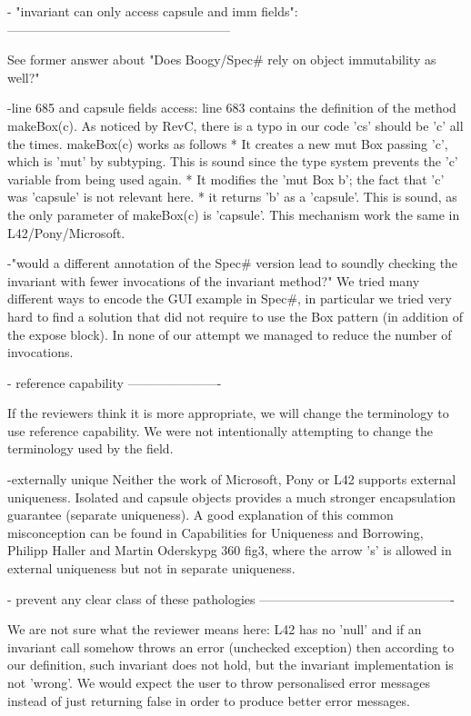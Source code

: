 - "invariant can only access capsule and imm fields":
-----------------------------------------------------

See former answer about "Does Boogy/Spec# rely on object immutability as well?"


-line 685 and capsule fields access:
line 683 contains the definition of the method makeBox(c).
As noticed by RevC, there is a typo in our code 'cs' should be 'c' all the times.
makeBox(c) works as follows
* It creates a new mut Box passing 'c', which is 'mut' by subtyping.
This is sound since the type system prevents the 'c' variable from being used again.
* It modifies the 'mut Box b'; the fact that 'c' was 'capsule' is not relevant here.
* it returns 'b' as a 'capsule'.  This is sound, as the only parameter 
of makeBox(c) is 'capsule'. This mechanism work the same in L42/Pony/Microsoft.

-"would a different annotation of the Spec# version lead to soundly checking the invariant with fewer invocations of the invariant method?"
We tried many different ways to encode the GUI example in Spec#, in particular we tried very hard to find a solution that did not require to use the Box pattern (in addition of the expose block).
In none of our attempt we managed to reduce the number of invocations.

- reference capability
----------------------

If the reviewers think it is more appropriate,
we will change the terminology to use reference capability.
We were not intentionally attempting to change the terminology used by the field.

-externally unique
Neither the work of Microsoft, Pony or L42 supports external uniqueness.
Isolated and capsule objects provides a much stronger encapsulation guarantee (separate uniqueness).
A good explanation of this common misconception can be found in
Capabilities for Uniqueness and Borrowing, Philipp Haller and Martin Oderskypg 360 fig3,
where the arrow 's' is allowed in external uniqueness but not in separate uniqueness.


- prevent any clear class of these pathologies
----------------------------------------------

We are not sure what the reviewer means here: L42 has no 'null' and if an invariant call
somehow throws an error (unchecked exception) then according to our definition,
such invariant does not hold, but the invariant implementation is not 'wrong'.
We would expect the user to throw personalised error messages instead of just returning false
in order to produce better error messages.

